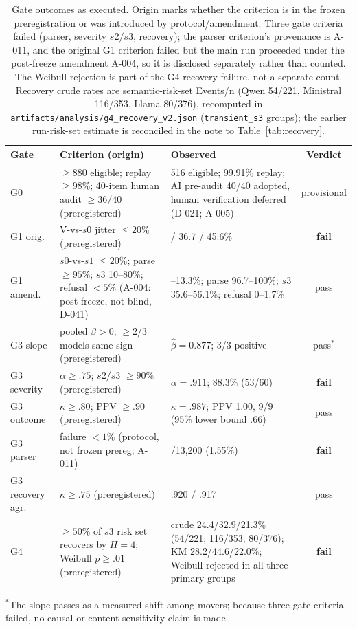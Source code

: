 \documentclass[a4paper,fleqn]{cas-sc}
\begin{document}
\begin{table}[pos=htbp]
  \centering
  \caption{Gate outcomes as executed. Origin marks whether the criterion is in the frozen
  preregistration or was introduced by protocol/amendment. Three gate criteria failed (parser,
  severity $s2/s3$, recovery); the parser criterion's provenance is A-011, and the original G1
  criterion failed but the main run proceeded under the post-freeze amendment A-004, so it is
  disclosed separately rather than counted. The Weibull
  rejection is part of the G4 recovery failure, not a separate count. Recovery crude rates are
  semantic-risk-set Events/n (Qwen 54/221, Ministral 116/353, Llama 80/376), recomputed in
  \texttt{artifacts/analysis/g4\_recovery\_v2.json} (\texttt{transient\_s3} groups); the earlier
  run-risk-set estimate is reconciled in the note to Table~\ref{tab:recovery}.}
  \label{tab:gate-status}
  \footnotesize
  \setlength{\tabcolsep}{4pt}
  \begin{tabular}{>{\raggedright\arraybackslash}p{1.4cm}>{\raggedright\arraybackslash}p{6.4cm}>{\raggedright\arraybackslash}p{4.6cm}c}
    \toprule
    \textbf{Gate} & \textbf{Criterion (origin)} & \textbf{Observed} & \textbf{Verdict} \\
    \midrule
    G0 & $\ge880$ eligible; replay $\ge98\%$; 40-item human audit $\ge36/40$ (preregistered) & 5{,}516 eligible; 99.91\% replay; AI pre-audit 40/40 adopted, human verification deferred (D-021; A-005) & provisional \\
    G1 orig.\ & V-vs-$s0$ jitter $\le20\%$ (preregistered) & 20.3 / 36.7 / 45.6\% & \textbf{fail} \\
    G1 amend.\ & $s0$-vs-$s1$ $\le20\%$; parse $\ge95\%$; $s3$ 10--80\%; refusal $<5\%$ (A-004: post-freeze, not blind, D-041) & 10.5--13.3\%; parse 96.7--100\%; $s3$ 35.6--56.1\%; refusal 0--1.7\% & pass \\
    G3 slope & pooled $\beta>0$; $\ge2/3$ models same sign (preregistered) & $\hat\beta=0.877$; 3/3 positive & pass$^{\ast}$ \\
    G3 severity & $\alpha\ge.75$; $s2/s3$ $\ge90\%$ (preregistered) & $\alpha=.911$; 88.3\% (53/60) & \textbf{fail} \\
    G3 outcome & $\kappa\ge.80$; PPV $\ge.90$ (preregistered) & $\kappa=.987$; PPV 1.00, 9/9 (95\% lower bound .66) & pass \\
    G3 parser & failure $<1\%$ (protocol, not frozen prereg; A-011) & 205/13{,}200 (1.55\%) & \textbf{fail} \\
    G3 recovery agr.\ & $\kappa\ge.75$ (preregistered) & .920 / .917 & pass \\
    G4 & $\ge50\%$ of $s3$ risk set recovers by $H=4$; Weibull $p\ge.01$ (preregistered) & crude 24.4/32.9/21.3\% (54/221; 116/353; 80/376); KM 28.2/44.6/22.0\%; Weibull rejected in all three primary groups & \textbf{fail} \\
    \bottomrule
  \end{tabular}
\end{table}
\noindent $^{\ast}$The slope passes as a measured shift among movers; because three gate criteria
failed, no causal or content-sensitivity claim is made.
\end{document}
